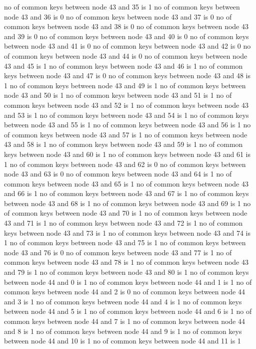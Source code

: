 no of common keys between node 43 and 35 is 1
no of common keys between node 43 and 36 is 0
no of common keys between node 43 and 37 is 0
no of common keys between node 43 and 38 is 0
no of common keys between node 43 and 39 is 0
no of common keys between node 43 and 40 is 0
no of common keys between node 43 and 41 is 0
no of common keys between node 43 and 42 is 0
no of common keys between node 43 and 44 is 0
no of common keys between node 43 and 45 is 1
no of common keys between node 43 and 46 is 1
no of common keys between node 43 and 47 is 0
no of common keys between node 43 and 48 is 1
no of common keys between node 43 and 49 is 1
no of common keys between node 43 and 50 is 1
no of common keys between node 43 and 51 is 1
no of common keys between node 43 and 52 is 1
no of common keys between node 43 and 53 is 1
no of common keys between node 43 and 54 is 1
no of common keys between node 43 and 55 is 1
no of common keys between node 43 and 56 is 1
no of common keys between node 43 and 57 is 1
no of common keys between node 43 and 58 is 1
no of common keys between node 43 and 59 is 1
no of common keys between node 43 and 60 is 1
no of common keys between node 43 and 61 is 1
no of common keys between node 43 and 62 is 0
no of common keys between node 43 and 63 is 0
no of common keys between node 43 and 64 is 1
no of common keys between node 43 and 65 is 1
no of common keys between node 43 and 66 is 1
no of common keys between node 43 and 67 is 1
no of common keys between node 43 and 68 is 1
no of common keys between node 43 and 69 is 1
no of common keys between node 43 and 70 is 1
no of common keys between node 43 and 71 is 1
no of common keys between node 43 and 72 is 1
no of common keys between node 43 and 73 is 1
no of common keys between node 43 and 74 is 1
no of common keys between node 43 and 75 is 1
no of common keys between node 43 and 76 is 0
no of common keys between node 43 and 77 is 1
no of common keys between node 43 and 78 is 1
no of common keys between node 43 and 79 is 1
no of common keys between node 43 and 80 is 1
no of common keys between node 44 and 0 is 1
no of common keys between node 44 and 1 is 1
no of common keys between node 44 and 2 is 0
no of common keys between node 44 and 3 is 1
no of common keys between node 44 and 4 is 1
no of common keys between node 44 and 5 is 1
no of common keys between node 44 and 6 is 1
no of common keys between node 44 and 7 is 1
no of common keys between node 44 and 8 is 1
no of common keys between node 44 and 9 is 1
no of common keys between node 44 and 10 is 1
no of common keys between node 44 and 11 is 1
